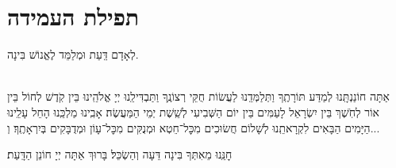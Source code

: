 \documentclass[twoside, openany, parskip=half, 11pt]{book}
\begin{document}
\emesveemuna


\boruchhashemleolam

\yerueinnu

\halfkaddish

\section[תפילת העמידה]{ תפילת העמידה }


\amidaopening{\ayt}{}

לְאָדָם דַּֽעַת וּמְלַמֵּד לֶאֱנוֹשׁ בִּינָה.

\begin{sometimes}

\\
אַתָּה חוֹנַנְתָּֽנוּ לְמַדַּע תּוֹרָתֶֽךָ וַתְּלַמְּדֵֽנוּ לַעֲשׂוֹת חֻקֵּי רְצוֹנֶֽךָ וַתַּבְדִּילֵֽנוּ יְיָ אֱלֹהֵֽינוּ בֵּין קֹֽדֶשׁ לְחוֹל בֵּין אוֹר לְחֹֽשֶׁךְ בֵּין יִשְׂרָאֵל לָעַמִּים בֵּין יוֹם הַשְּׁבִיעִי לְשֵֽׁשֶׁת יְמֵי הַמַּעֲשֶׂה׃ אָבִֽינוּ מַלְכֵּֽנוּ הָחֵל עָלֵֽינוּ הַיָּמִים הַבָּאִים לִקְרָאתֵֽנוּ לְשָׁלוֹם חֲשׂוּכִים מִכׇּל־חֵטְא וּמְנֻקִּים מִכׇּל־עָוֹן וּמְדֻבָּקִים בְּיִרְאָתֶֽךָ׃ וְ...

\end{sometimes}

חׇנֵּֽנוּ מֵאִתְּךָ בִּינָה דֵּעָה וְהַשְׂכֵּל׃ בָּרוּךְ אַתָּה יְיָ חוֹנֵן הַדָּֽעַת׃

\weekdaysateshuva

\weekdaysaselichah

\weekdaysageulah

\weekdaysarefuah

\weekdaysaberacha

\weekdaysashofar

\weekdaysamishpat

\weekdaysaminim

\weekdaysatzadikim

\weekdaysayerushelayim

\weekdaysamalchus

\weekdaysashemakoleinu

\retzeh

\yaalehveyavo

\zion

\maarivmodim

\alhanisim

\weekdaysahodos
\end{document}
